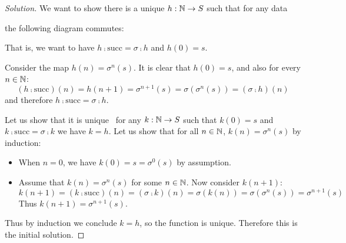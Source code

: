 \begin{proof}[Solution]
    We want to show there is a unique $h: \mathbb{N} \to S$ such that for any data
    \begin{center}
    \end{center}
    the following diagram commutes:
    \begin{center}
    \end{center}
    That is, we want to have $h \comp \mathrm{succ} = \sigma \comp h$ and
    $h(0) = s$.

    Consider the map $h(n) = \sigma^n (s)$. It is clear that $h(0) = s$,
    and also for every $n \in \mathbb{N}$:
    \[ (h \comp \mathrm{succ})(n) = h(n+1) = \sigma^{n+1}(s) =
    \sigma(\sigma^{n}(s)) = (\sigma \comp h)(n) \]
    and therefore $h \comp \mathrm{succ} = \sigma \comp h$.

    Let us show that it is unique \ie\ for any $k:\mathbb{N}\to S$ such that
    $k(0) = s$ and $k \comp \mathrm{succ} = \sigma \comp k$ we have $k = h$.
    Let us show that for all $n \in \mathbb{N}$, $k(n) = \sigma^{n} (s)$ by
    induction:

    \begin{itemize}

    \item When $n=0$, we have $k(0) = s = \sigma^0(s)$ by assumption.

    \item Assume that $k(n) = \sigma^n(s)$ for some $n \in \mathbb{N}$. Now consider
    $k(n+1)$:
    \[ k(n + 1) = (k \comp \mathrm{succ})(n) = (\sigma \comp k)(n) =
    \sigma(k(n)) = \sigma(\sigma^{n}(s)) = \sigma^{n+1}(s) \]
    Thus $k(n + 1) = \sigma^{n + 1}(s)$.

    \end{itemize}

    Thus by induction we conclude $k = h$, so the function is unique. Therefore
    this is the initial solution.
\end{proof}


